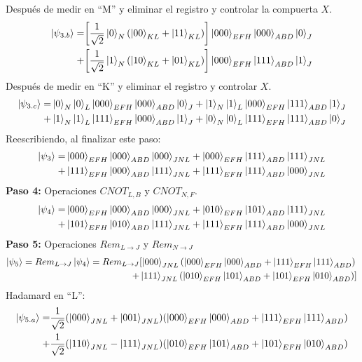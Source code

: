 Después de medir en ``M'' y eliminar el registro y controlar la compuerta $X$.
\begin{align*}
\ket{\psi_{3.b}} = & \qty[ \frac{1}{\sqrt{2}} \ket{0}_{N}(\ket{00}_{KL}+\ket{11}_{KL})]\ket{000}_{EFH}\ket{000}_{ABD}\ket{0}_{J} \\
                 + & \qty[ \frac{1}{\sqrt{2}} \ket{1}_{N}(\ket{10}_{KL}+\ket{01}_{KL})]\ket{000}_{EFH}\ket{111}_{ABD}\ket{1}_{J} \\
\end{align*}
Después de medir en ``K'' y eliminar el registro y controlar $X$.
\begin{align*}
\ket{\psi_{3.c}}
= & \ket{0}_{N} \ket{0}_{L} \ket{000}_{EFH} \ket{000}_{ABD} \ket{0}_{J}
  + \ket{1}_{N} \ket{1}_{L} \ket{000}_{EFH} \ket{111}_{ABD} \ket{1}_{J} \\
+ & \ket{1}_{N} \ket{1}_{L} \ket{111}_{EFH} \ket{000}_{ABD} \ket{1}_{J} 
  + \ket{0}_{N} \ket{0}_{L} \ket{111}_{EFH} \ket{111}_{ABD} \ket{0}_{J} 
\end{align*}
Reescribiendo, al finalizar este paso:
\begin{align*}
\ket{\psi_{3}}=&\ket{000}_{EFH} \ket{000}_{ABD} \ket{000}_{JNL} +\ket{000}_{EFH} \ket{111}_{ABD} \ket{111}_{JNL} \\
+&\ket{111}_{EFH} \ket{000}_{ABD} \ket{111}_{JNL} + \ket{111}_{EFH} \ket{111}_{ABD} \ket{000}_{JNL} 
\end{align*}
\textbf{Paso 4:} Operaciones $ CNOT_{L,B} $ y $ CNOT_{N,F} $.
\begin{align*}
\ket{\psi_{4}} = 
  & \ket{000}_{EFH} \ket{000}_{ABD} \ket{000}_{JNL} + \ket{010}_{EFH} \ket{101}_{ABD} \ket{111}_{JNL} \\
 +& \ket{101}_{EFH} \ket{010}_{ABD} \ket{111}_{JNL} + \ket{111}_{EFH} \ket{111}_{ABD} \ket{000}_{JNL}  
\end{align*}
\textbf{Paso 5:} Operaciones $ Rem_{L \rightarrow J} $ y  $ Rem_{N \rightarrow J} $ 
\begin{align*}
\ket{\psi_5}=  Rem_{L \rightarrow J} \ket{\psi_4} = Rem_{L \rightarrow J} & [ \ket{000}_{JNL}(\ket{000}_{EFH} \ket{000}_{ABD}+\ket{111}_{EFH} \ket{111}_{ABD}) \\
+ & \ket{111}_{JNL}(\ket{010}_{EFH} \ket{101}_{ABD}+\ket{101}_{EFH} \ket{010}_{ABD})]
\end{align*}
Hadamard en ``L'':
\begin{align*}
\ket{\psi_{5.a}}= & \dfrac{1}{\sqrt{2}}  (\ket{000}_{JNL}+\ket{001}_{JNL})(\ket{000}_{EFH}\ket{000}_{ABD}+\ket{111}_{EFH}\ket{111}_{ABD}) \\
+ & \dfrac{1}{\sqrt{2}} (\ket{110}_{JNL}-\ket{111}_{JNL})(\ket{010}_{EFH} \ket{101}_{ABD}+\ket{101}_{EFH} \ket{010}_{ABD})
\end{align*}
